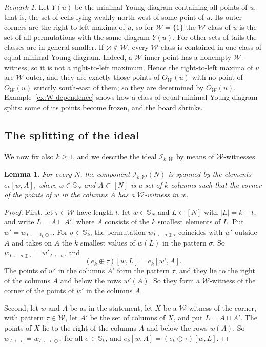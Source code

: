 \documentclass[11pt]{amsart}
\newtheorem{lemma}[theorem]{Lemma}
\theoremstyle{definition}
\theoremstyle{remark}
\newtheorem{remark}[theorem]{Remark}
\newcommand{\bS}{\mathbb{S}}
\newcommand{\cI}{\mathscr{I}}
\newcommand{\cW}{\mathcal{W}}
\newcommand{\id}{\mathrm{id}}
\begin{document}
\begin{remark}\label{rem:young-classes}
Let $Y(u)$ be the minimal Young diagram containing all points of $u$, that is, the set of cells lying weakly north-west of some point of $u$. Its outer corners are the right-to-left maxima of $u$, so for $\cW=\{1\}$ the $\cW$-class of $u$ is the set of all permutations with the same diagram $Y(u)$. For other sets of tails the classes are in general smaller. If $\varnothing\notin\cW$, every $\cW$-class is contained in one class of equal minimal Young diagram. Indeed, a $\cW$-inner point has a nonempty $\cW$-witness, so it is not a right-to-left maximum. Hence the right-to-left maxima of $u$ are $\cW$-outer, and they are exactly those points of $O_\cW(u)$ with no point of $O_\cW(u)$ strictly south-east of them; so they are determined by $O_\cW(u)$. Example~\ref{ex:W-dependence} shows how a class of equal minimal Young diagram splits: some of its points become frozen, and the board shrinks.
\end{remark}

\subsection{The splitting of the ideal}\label{sec:splitting}

We now fix also $k\ge1$, and we describe the ideal $\cI_{k,\cW}$ by means of $\cW$-witnesses.

\begin{lemma}\label{lem:bwx-ideal}
For every $N$, the component $\cI_{k,\cW}(N)$ is spanned by the elements $e_k[w,A]$, where $w\in\bS_N$ and $A\subset[N]$ is a set of $k$ columns such that the corner of the points of $w$ in the columns $A$ has a $\cW$-witness in $w$.
\end{lemma}

\begin{proof}
First, let $\tau\in\cW$ have length $t$, let $w\in\bS_N$ and $L\subset[N]$ with $|L|=k+t$, and write $L=A\sqcup A'$, where $A$ consists of the $k$ smallest elements of $L$. Put $w'=w_{L\leftarrow\id_k\oplus\tau}$. For $\sigma\in\bS_k$, the permutation $w_{L\leftarrow\sigma\oplus\tau}$ coincides with $w'$ outside $A$ and takes on $A$ the $k$ smallest values of $w(L)$ in the pattern $\sigma$. So $w_{L\leftarrow\sigma\oplus\tau}=w'_{A\leftarrow\sigma}$, and
\[
(e_k\oplus\tau)[w,L]=e_k[w',A].
\]
The points of $w'$ in the columns $A'$ form the pattern $\tau$, and they lie to the right of the columns $A$ and below the rows $w'(A)$. So they form a $\cW$-witness of the corner of the points of $w'$ in the columns $A$.

Second, let $w$ and $A$ be as in the statement, let $X$ be a $\cW$-witness of the corner, with pattern $\tau\in\cW$, let $A'$ be the set of columns of $X$, and put $L=A\sqcup A'$. The points of $X$ lie to the right of the columns $A$ and below the rows $w(A)$. So $w_{A\leftarrow\sigma}=w_{L\leftarrow\sigma\oplus\tau}$ for all $\sigma\in\bS_k$, and $e_k[w,A]=(e_k\oplus\tau)[w,L]$.
\end{proof}
\end{document}
